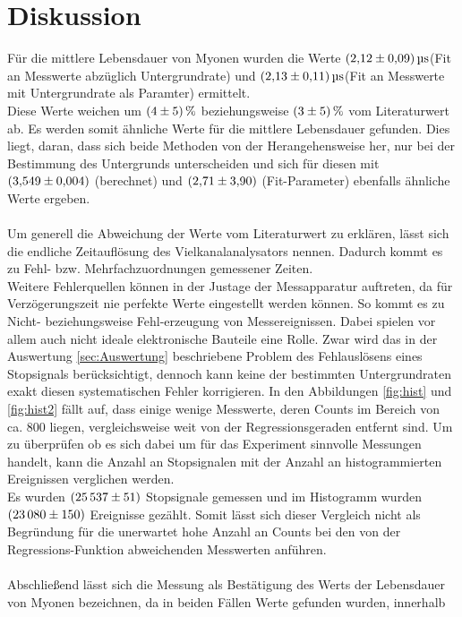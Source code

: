 \section{Diskussion}
\label{sec:Diskussion}
Für die mittlere Lebensdauer von Myonen wurden die Werte
$\SI{2.12+-0.09}{\micro\second}$(Fit an Messwerte abzüglich Untergrundrate) und
$\SI{2.13+-0.11}{\micro\second}$(Fit an Messwerte mit Untergrundrate als
Paramter) ermittelt.\\
Diese Werte weichen um $\SI{4+-5}{\percent}$ beziehungsweise
$\SI{3+-5}{\percent}$ vom Literaturwert\cite{lebensdauer} ab.
Es werden somit ähnliche Werte für die mittlere Lebensdauer gefunden. Dies liegt,
daran, dass sich beide Methoden von der Herangehensweise her, nur bei der Bestimmung des Untergrunds
unterscheiden und sich für diesen mit $\SI{3.549+-0.004}{}$ (berechnet) und $\SI{2.71+-3.90}{}$ (Fit-Parameter) ebenfalls ähnliche Werte ergeben.\\ \\
Um generell die Abweichung der Werte vom Literaturwert zu erklären, lässt
sich die endliche Zeitauflösung des Vielkanalanalysators nennen. Dadurch
kommt es zu Fehl- bzw. Mehrfachzuordnungen gemessener Zeiten.\\
Weitere Fehlerquellen können in der Justage der Messapparatur auftreten,
da für Verzögerungszeit nie perfekte Werte eingestellt werden können. So kommt es zu Nicht-
beziehungsweise Fehl-erzeugung von Messereignissen. Dabei spielen vor allem auch nicht ideale elektronische Bauteile eine Rolle.
Zwar wird das in der Auswertung \ref{sec:Auswertung} beschriebene
Problem des Fehlauslösens eines Stopsignals berücksichtigt, dennoch kann
keine der bestimmten Untergrundraten exakt diesen systematischen Fehler
korrigieren. In den Abbildungen \ref{fig:hist} und \ref{fig:hist2} fällt auf, dass einige wenige Messwerte, deren Counts im Bereich von ca. 800 liegen,
vergleichsweise weit von der Regressionsgeraden entfernt sind. Um zu überprüfen ob es sich dabei um für das Experiment sinnvolle Messungen handelt, kann
die Anzahl an Stopsignalen mit der Anzahl an histogrammierten Ereignissen verglichen werden.\\
Es wurden $\SI{25537+-51}{}$ Stopsignale gemessen und im Histogramm wurden $\SI{23080+-150}{}$
Ereignisse gezählt. Somit lässt sich dieser Vergleich nicht als Begründung für die unerwartet hohe Anzahl an Counts bei den von der Regressions-Funktion abweichenden
Messwerten anführen. \\ \\
Abschließend lässt sich die Messung als Bestätigung des Werts der Lebensdauer von Myonen bezeichnen, da in beiden Fällen Werte gefunden wurden, innerhalb
